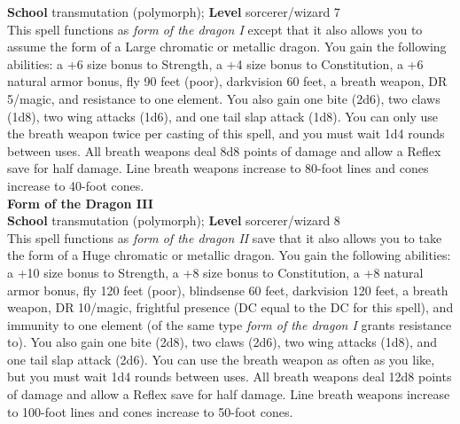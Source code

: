 \textbf{School }transmutation (polymorph); \textbf{Level }sorcerer/wizard 7\\
This spell functions as \textit{form of the dragon I }except that it also allows you to assume the form of a Large chromatic or metallic dragon. You gain the following abilities: a +6 size bonus to Strength, a +4 size bonus to Constitution, a +6 natural armor bonus, fly 90 feet (poor), darkvision 60 feet, a breath weapon, DR 5/magic, and resistance to one element. You also gain one bite (2d6), two claws (1d8), two wing attacks (1d6), and one tail slap attack (1d8). You can only use the breath weapon twice per casting of this spell, and you must wait 1d4 rounds between uses. All breath weapons deal 8d8 points of damage and allow a Reflex save for half damage. Line breath weapons increase to 80-foot lines and cones increase to 40-foot cones.\\
\textbf{Form of the Dragon III}\\
\textbf{School }transmutation (polymorph); \textbf{Level }sorcerer/wizard 8\\
This spell functions as \textit{form of the dragon II }save that it also allows you to take the form of a Huge chromatic or metallic dragon. You gain the following abilities: a +10 size bonus to Strength, a +8 size bonus to Constitution, a +8 natural armor bonus, fly 120 feet (poor), blindsense 60 feet, darkvision 120 feet, a breath weapon, DR 10/magic, frightful presence (DC equal to the DC for this spell), and immunity to one element (of the same type \textit{form of the dragon I }grants resistance to). You also gain one bite (2d8), two claws (2d6), two wing attacks (1d8), and one tail slap attack (2d6). You can use the breath weapon as often as you like, but you must wait 1d4 rounds between uses. All breath weapons deal 12d8 points of damage and allow a Reflex save for half damage. Line breath weapons increase to 100-foot lines and cones increase to 50-foot cones.\\
